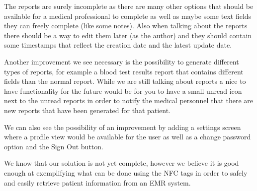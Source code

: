 The reports are surely incomplete as there are many other options that should be available for a medical professional to complete as well as maybe some text fields they can freely complete (like some notes). Also when talking about the reports there should be a way to edit them later (as the author) and they should contain some timestamps that reflect the creation date and the latest update date.

Another improvement we see necessary is the possibility to generate different types of reports, for example a blood test results report that contains different fields than the normal report. While we are still talking about reports a nice to have functionality for the future would be for you to have a small unread icon next to the unread reports in order to notify the medical personnel that there are new reports that have been generated for that patient.

We can also see the possibility of an improvement by adding a settings screen where a profile view would be available for the user as well as a change password option and the Sign Out button.

We know that our solution is not yet complete, however we believe it is good enough at exemplifying what can be done using the NFC tags in order to safely and easily retrieve patient information from an EMR system.